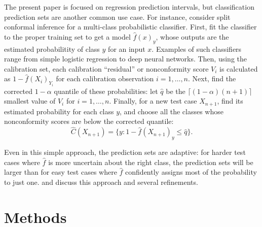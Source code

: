 \documentclass[10.5pt, letterpaper]{article}
\numberwithin{table}{section}
\numberwithin{figure}{section}
\numberwithin{equation}{section}
\begin{document}
The present paper is focused on regression prediction intervals, but classification prediction sets are another common use case.
For instance, consider split conformal inference for a multi-class probabilistic classifier. First, fit the classifier to the proper training set to get a model $\hat f(x)_y$, whose outputs are the estimated probabilitity of class $y$ for an input $x$. Examples of such classifiers range from simple logistic regression to deep neural networks. Then, using the calibration set, each calibration ``residual'' or nonconformity score $V_i$ is calculated as $1-\hat{f}(X_i)_{Y_i}$ for each calibration observation $i=1,\ldots,n$.
Next, find the corrected $1-\alpha$ quantile of these probabilities: let $\hat q$ be the $\lceil (1-\alpha)(n+1)\rceil$ smallest value of $V_i$ for $i=1,\ldots,n$.
Finally, for a new test case $X_{n+1}$, find its estimated probability for each class $y$, and choose all the classes whose nonconformity scores are below the corrected quantile:
\[ \hat{C}(X_{n+1}) = \{y: 1-\hat f(X_{n+1})_y \leq \hat q \}. \]

Even in this simple approach, the prediction sets are adaptive: for harder test cases where $\hat f$ is more uncertain about the right class, the prediction sets will be larger than for easy test cases where $\hat f$ confidently assigns most of the probability to just one. \cite{romano2020classification} and \cite{angelopoulos2022gentle} discuss this approach and several refinements.







\section{Methods}\label{sec:Methods}
\end{document}
